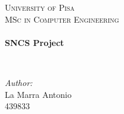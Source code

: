 \begin{titlepage}
\begin{center}

\textsc{\LARGE University of Pisa}\\[1.5cm]

\textsc{\Large MSc in Computer Engineering}\\[0.5cm]

\HRule \\[0.4cm]
{ \huge \bfseries SNCS Project \\[0.4cm] }

\HRule \\[1.5cm]


\begin{minipage}{0.4\textwidth}
 \large
\emph{Author:}\\
La Marra Antonio\\ 439833

\end{minipage}

\vfill


\end{center}
\end{titlepage}
